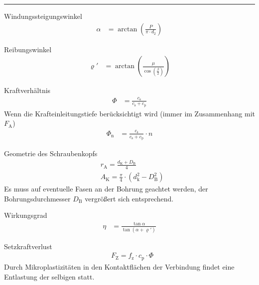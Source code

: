 \hrule
\begin{eeqn}{Windungs\-steigungs\-winkel}
	\begin{align}
	\alpha &= \arctan{\left(\frac{P}{\pi \cdot d_2}\right)}
	\end{align}
\end{eeqn}

\begin{eeqn}{Reibungs\-winkel}
	\begin{align}
	\varrho' &= \arctan{\left(\frac{\mu}{\cos{\left(\frac{\beta}{2}\right)}}\right)}
	\end{align}
\end{eeqn}

\begin{eeqn}{Kraftverhältnis}
	\begin{align}
		\Phi & = \frac{c_\text{s}}{c_\text{s}+c_\text{p}}
	\end{align}
	Wenn die Krafteinleitungstiefe berücksichtigt wird (immer im Zusammenhang mit $F_\text{A}$)
	\begin{align}
		\Phi_\text{n} & = \frac{c_\text{s}}{c_\text{s}+c_\text{p}} \cdot n
	\end{align}
\end{eeqn}

\begin{eeqn}{Geometrie des Schraubenkopfs}
	\begin{align}
		& r_\text{A} = \frac{d_\text{K}+D_\text{B}}{4} \\
		& A_\text{K} = \frac{\pi}{4} \cdot (d_\text{k}^2-D_\text{B}^2)
	\end{align}
	Es muss auf eventuelle Fasen an der Bohrung geachtet werden, der Bohrungsdurchmesser $D_\text{B}$ vergrößert sich entsprechend.
\end{eeqn}

\begin{eeqn}{Wirkungsgrad}
	\begin{align}
		\eta & = \frac{\tan \alpha}{\tan(\alpha + \varrho')}
	\end{align}
\end{eeqn}

\begin{eeqn}{Setzkraftverlust}
	\begin{align}
		& F_\text{Z} = f_\text{z} \cdot c_\text{p} \cdot \Phi
	\end{align}
	Durch Mikroplastizitäten in den Kontaktflächen der Verbindung findet eine Entlastung der selbigen statt. 
\end{eeqn}

